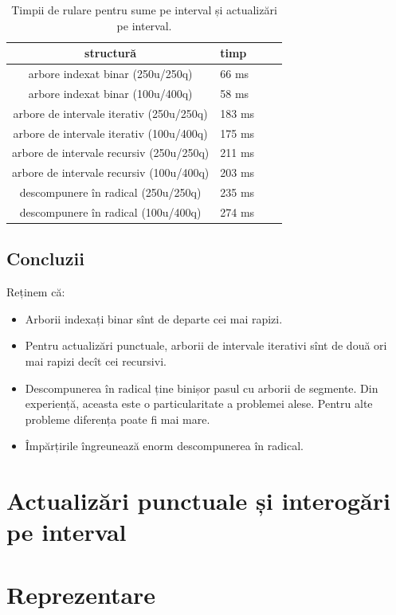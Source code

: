 \documentclass[../main.tex]{subfiles}
\begin{document}
\begin{table}[!htbp]
  \centering
  \begin{tabular}{SlSr}
    \textbf{structură} & \textbf{timp} \\
    \hline
     arbore indexat binar (250u/250q) & 66 ms \\
     arbore indexat binar (100u/400q) & 58 ms \\
     arbore de intervale iterativ (250u/250q) & 183 ms \\
     arbore de intervale iterativ (100u/400q) & 175 ms \\
     arbore de intervale recursiv (250u/250q) & 211 ms \\
     arbore de intervale recursiv (100u/400q) & 203 ms \\
     descompunere în radical (250u/250q) & 235 ms \\
     descompunere în radical (100u/400q) & 274 ms \\
    \hline
  \end{tabular}

  \caption{Timpii de rulare pentru sume pe interval și actualizări pe interval.}
\end{table}

\subsection{Concluzii}

Reținem că:

\begin{itemize}
  \item Arborii indexați binar sînt de departe cei mai rapizi.
  \item Pentru actualizări punctuale, arborii de intervale iterativi sînt de două ori mai rapizi decît cei recursivi.
  \item Descompunerea în radical ține binișor pasul cu arborii de segmente. Din experiență, aceasta este o particularitate a problemei alese. Pentru alte probleme diferența poate fi mai mare.
  \item Împărțirile îngreunează enorm descompunerea în radical.
\end{itemize}


\section{Actualizări punctuale și interogări pe interval}

\section{Reprezentare}
\end{document}
